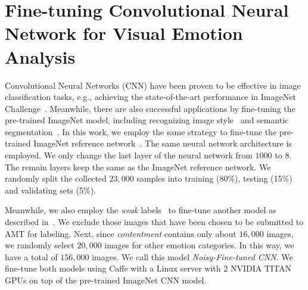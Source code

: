 \documentclass[letterpaper]{article}
\begin{document}
\section{Fine-tuning Convolutional Neural Network for Visual Emotion Analysis}
\label{sec:cnn}
Convolutional Neural Networks (CNN) have been proven to be effective in image classification tasks, e.g., achieving the state-of-the-art performance in ImageNet Challenge~\cite{krizhevsky2012imagenet}. Meanwhile, there are also successful applications by fine-tuning the pre-trained ImageNet model, including recognizing image style~\cite{karayev2013recognizing} and semantic segmentation~\cite{long2014fully}. In this work, we employ the same strategy to fine-tune the pre-trained ImageNet reference network~\cite{jia2014caffe}. The same neural network architecture is employed. We only change the last layer of the neural network from $1000$ to $8$. The remain layers keep the same as the ImageNet reference network. We randomly split the collected $23,000$ samples into training (80\%), testing (15\%) and validating sets (5\%).

Meanwhile, we also employ the \textit{weak} labels~\cite{jia2012can} to fine-tune another model as described in~\cite{you2015robust}. We exclude those images that have been chosen to be submitted to AMT for labeling. Next, since \textit{contentment} contains only about $16,000$ images, we randomly select $20,000$ images for other emotion categories. In this way, we have a total of $156,000$ images. We call this model \textit{Noisy-Fine-tuned CNN}. We fine-tune both models using Caffe with a Linux server with 2 NVIDIA TITAN GPUs on top of the pre-trained ImageNet CNN model. %
\end{document}
